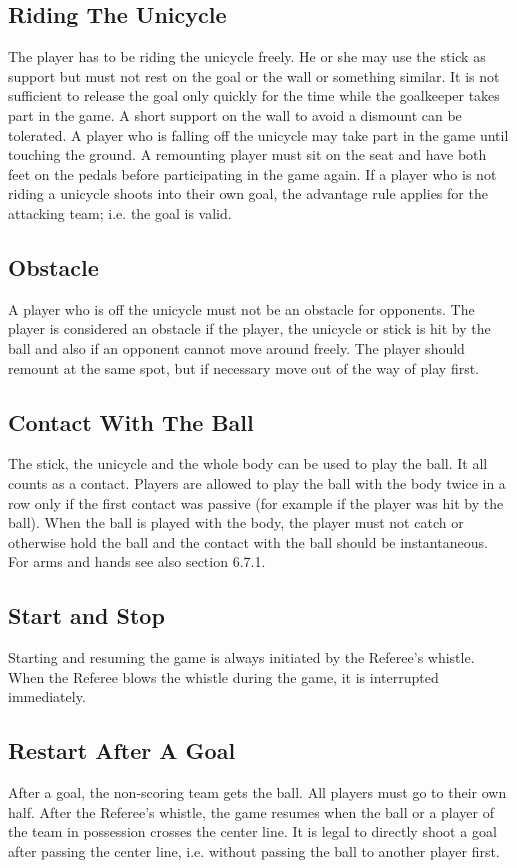 \subsection{Riding The Unicycle}
The player has to be riding the unicycle freely. He or she may use the stick as support but must not rest on the goal or
the wall or something similar. It is not sufficient to release the goal only quickly for the time while the goalkeeper takes
part in the game. A short support on the wall to avoid a dismount can be tolerated. A player who is falling off the
unicycle may take part in the game until touching the ground. A remounting player must sit on the seat and have both
feet on the pedals before participating in the game again. If a player who is not riding a unicycle shoots into their own
goal, the advantage rule applies for the attacking team; i.e. the goal is valid.
\subsection{Obstacle}
A player who is off the unicycle must not be an obstacle for opponents. The player is considered an obstacle if the
player, the unicycle or stick is hit by the ball and also if an opponent cannot move around freely. The player should
remount at the same spot, but if necessary move out of the way of play first.
\subsection{Contact With The Ball}
The stick, the unicycle and the whole body can be used to play the ball. It all counts as a contact. Players are allowed to
play the ball with the body twice in a row only if the first contact was passive (for example if the player was hit by the
ball). When the ball is played with the body, the player must not catch or otherwise hold the ball and the contact with
the ball should be instantaneous. For arms and hands see also section 6.7.1.
\subsection{Start and Stop}
Starting and resuming the game is always initiated by the Referee's whistle. When the Referee blows the whistle during
the game, it is interrupted immediately.
\subsection{Restart After A Goal}
After a goal, the non-scoring team gets the ball. All players must go to their own half. After the Referee's whistle, the
game resumes when the ball or a player of the team in possession crosses the center line. It is legal to directly shoot a
goal after passing the center line, i.e. without passing the ball to another player first.
